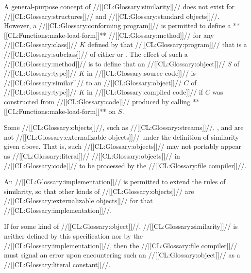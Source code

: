 
 A general-purpose concept of //[[CL:Glossary:similarity]]// does not exist for //[[CL:Glossary:structures]]// and //[[CL:Glossary:standard objects]]//. However, a //[[CL:Glossary:conforming program]]// is permitted to define a **[[CL:Functions:make-load-form]]** //[[CL:Glossary:method]]// for any //[[CL:Glossary:class]]// $K$ defined by that //[[CL:Glossary:program]]// that is a //[[CL:Glossary:subclass]]// of either  or . The effect of such a //[[CL:Glossary:method]]// is to define that an //[[CL:Glossary:object]]// $S$ of //[[CL:Glossary:type]]// $K$ in //[[CL:Glossary:source code]]// is //[[CL:Glossary:similar]]// to an //[[CL:Glossary:object]]// $C$ of //[[CL:Glossary:type]]// $K$ in //[[CL:Glossary:compiled code]]// if $C$ was constructed from //[[CL:Glossary:code]]// produced by  calling **[[CL:Functions:make-load-form]]** on $S$.

\endlist

\endsubsubsection%


Some //[[CL:Glossary:objects]]//, such as //[[CL:Glossary:streams]]//, , and  are not //[[CL:Glossary:externalizable objects]]// under the definition of similarity given above. That is, such //[[CL:Glossary:objects]]// may not portably appear as //[[CL:Glossary:literal]]// //[[CL:Glossary:objects]]//  in //[[CL:Glossary:code]]// to be processed by the //[[CL:Glossary:file compiler]]//. 

An //[[CL:Glossary:implementation]]// is permitted to extend the rules of similarity,  so that other kinds of //[[CL:Glossary:objects]]// are //[[CL:Glossary:externalizable objects]]// for that //[[CL:Glossary:implementation]]//.

If for some kind of //[[CL:Glossary:object]]//, //[[CL:Glossary:similarity]]// is neither defined by this specification  	    nor by the //[[CL:Glossary:implementation]]//,  then the //[[CL:Glossary:file compiler]]// must signal an error upon encountering such  an //[[CL:Glossary:object]]// as a //[[CL:Glossary:literal constant]]//.

\endsubsubsection%

